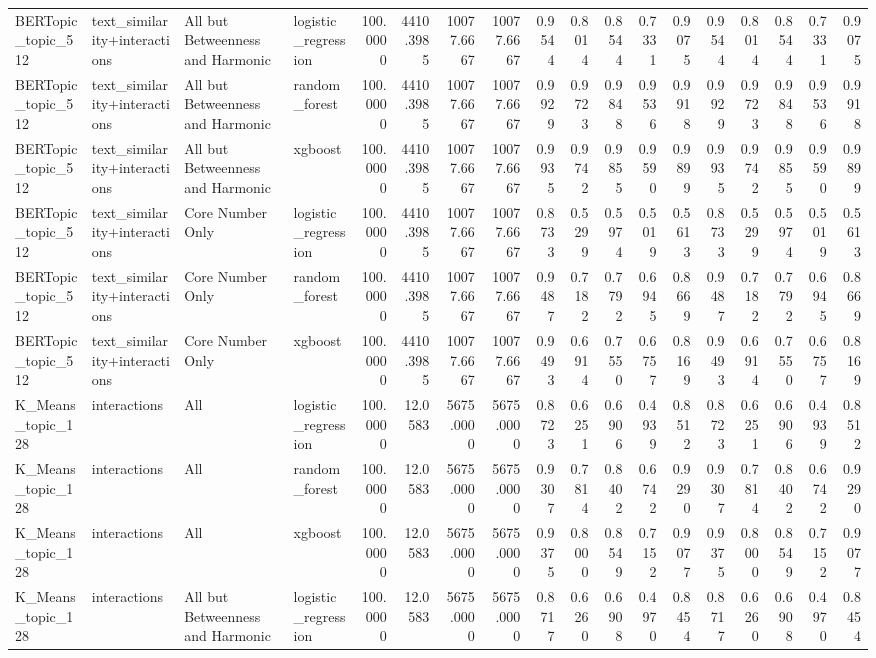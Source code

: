 \begin{tabular}{llllrrrrrrrrrrrrrr}
BERTopic_topic_512 & text_similarity+interactions & All but Betweenness and Harmonic & logistic_regression & 100.0000 & 4410.3985 & 10077.6667 & 10077.6667 & 0.9544 & 0.8014 & 0.8544 & 0.7331 & 0.9075 & 0.9544 & 0.8014 & 0.8544 & 0.7331 & 0.9075 \\
BERTopic_topic_512 & text_similarity+interactions & All but Betweenness and Harmonic & random_forest & 100.0000 & 4410.3985 & 10077.6667 & 10077.6667 & 0.9929 & 0.9723 & 0.9848 & 0.9536 & 0.9918 & 0.9929 & 0.9723 & 0.9848 & 0.9536 & 0.9918 \\
BERTopic_topic_512 & text_similarity+interactions & All but Betweenness and Harmonic & xgboost & 100.0000 & 4410.3985 & 10077.6667 & 10077.6667 & 0.9935 & 0.9742 & 0.9855 & 0.9590 & 0.9899 & 0.9935 & 0.9742 & 0.9855 & 0.9590 & 0.9899 \\
BERTopic_topic_512 & text_similarity+interactions & Core Number Only & logistic_regression & 100.0000 & 4410.3985 & 10077.6667 & 10077.6667 & 0.8733 & 0.5299 & 0.5974 & 0.5019 & 0.5613 & 0.8733 & 0.5299 & 0.5974 & 0.5019 & 0.5613 \\
BERTopic_topic_512 & text_similarity+interactions & Core Number Only & random_forest & 100.0000 & 4410.3985 & 10077.6667 & 10077.6667 & 0.9487 & 0.7182 & 0.7792 & 0.6945 & 0.8669 & 0.9487 & 0.7182 & 0.7792 & 0.6945 & 0.8669 \\
BERTopic_topic_512 & text_similarity+interactions & Core Number Only & xgboost & 100.0000 & 4410.3985 & 10077.6667 & 10077.6667 & 0.9493 & 0.6914 & 0.7550 & 0.6757 & 0.8169 & 0.9493 & 0.6914 & 0.7550 & 0.6757 & 0.8169 \\
K_Means_topic_128 & interactions & All & logistic_regression & 100.0000 & 12.0583 & 5675.0000 & 5675.0000 & 0.8723 & 0.6251 & 0.6906 & 0.4939 & 0.8512 & 0.8723 & 0.6251 & 0.6906 & 0.4939 & 0.8512 \\
K_Means_topic_128 & interactions & All & random_forest & 100.0000 & 12.0583 & 5675.0000 & 5675.0000 & 0.9307 & 0.7814 & 0.8402 & 0.6742 & 0.9290 & 0.9307 & 0.7814 & 0.8402 & 0.6742 & 0.9290 \\
K_Means_topic_128 & interactions & All & xgboost & 100.0000 & 12.0583 & 5675.0000 & 5675.0000 & 0.9375 & 0.8000 & 0.8549 & 0.7152 & 0.9077 & 0.9375 & 0.8000 & 0.8549 & 0.7152 & 0.9077 \\
K_Means_topic_128 & interactions & All but Betweenness and Harmonic & logistic_regression & 100.0000 & 12.0583 & 5675.0000 & 5675.0000 & 0.8717 & 0.6260 & 0.6908 & 0.4970 & 0.8454 & 0.8717 & 0.6260 & 0.6908 & 0.4970 & 0.8454 \\

\end{tabular}
